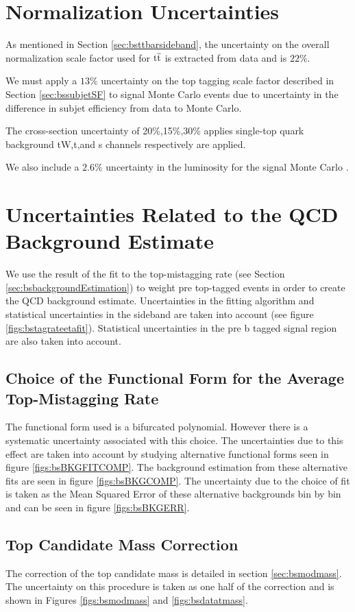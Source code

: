 \section{Normalization Uncertainties}
As mentioned in Section \ref{sec:bsttbarsideband}, the uncertainty on the overall normalization scale factor used for $\mathrm{t\overline{t}}$ is extracted from data and is $22\%$.   

We must apply a $13\%$ uncertainty on the top tagging scale factor described in Section \ref{sec:bssubjetSF} to signal Monte Carlo events due to uncertainty in the difference in subjet efficiency from data to Monte Carlo.

The cross-section uncertainty of 20\%,15\%,30\% applies single-top quark background tW,t,and s channels respectively are applied.

We also include a $2.6\%$ uncertainty in the luminosity for the signal Monte Carlo \cite{CMS-PAS-LUM-13-001}. 


\clearpage
\section{Uncertainties Related to the QCD Background Estimate}
We use the result of the fit to the top-mistagging rate (see Section \ref{sec:bsbackgroundEstimation}) to weight 
pre top-tagged events in order to create the QCD background estimate.  Uncertainties in
the fitting algorithm and statistical uncertainties in the sideband
are taken into account (see figure \ref{figs:bstagrateetafit}).
Statistical uncertainties in the pre b tagged signal region are also
taken into account.

\subsection{Choice of the Functional Form for the Average Top-Mistagging Rate}
\label{sec:bschoiceoffit}
The functional form used is a bifurcated polynomial.
However there is a systematic uncertainty associated with this choice.
The uncertainties due to this effect are taken into account by
studying alternative functional forms seen in figure
\ref{figs:bsBKGFITCOMP}.  The background estimation from these
alternative fits are seen in figure \ref{figs:bsBKGCOMP}.  The
uncertainty due to the choice of fit is taken as the Mean Squared
Error of these alternative backgrounds bin by bin and can be seen in
figure \ref{figs:bsBKGERR}.  

\subsection{Top Candidate Mass Correction}
\label{sec:bsmascorrerror}
The correction of the top candidate mass is detailed in section \ref{sec:bsmodmass}.  The uncertainty on this procedure is taken as one half of the correction 
and is shown in Figures \ref{figs:bsmodmass} and \ref{figs:bsdatatmass}.   


